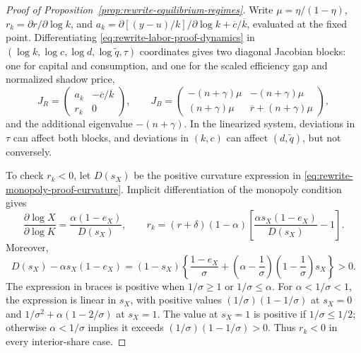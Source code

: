 \begin{proof}[Proof of Proposition~\ref{prop:rewrite-equilibrium-regimes}]
Write $\mu=\eta/(1-\eta)$,
$r_k=\partial r/\partial\log k$, and
$a_k=\partial[(y-u)/k]/\partial\log k+\overline c/\overline k$,
evaluated at the fixed point. Differentiating
\eqref{eq:rewrite-labor-proof-dynamics} in
$(\log k,\log c,\log d,\log\widetilde q,\tau)$ coordinates gives two
diagonal Jacobian blocks: one for capital and consumption, and one for the
scaled efficiency gap and normalized shadow price,
\begin{equation}
 J_R=\begin{pmatrix}
 a_k&-\overline c/\overline k\\ r_k&0
 \end{pmatrix},
 \qquad
 J_B=\begin{pmatrix}
 -(n+\gamma)\mu&-(n+\gamma)\mu\\
 (n+\gamma)\mu&\overline r+(n+\gamma)\mu
 \end{pmatrix},
 \label{eq:rewrite-labor-proof-blocks}
\end{equation}
and the additional eigenvalue $-(n+\gamma)$. In the linearized system,
deviations in $\tau$ can affect both blocks, and deviations in $(k,c)$
can affect $(d,\widetilde q)$, but not conversely.

To check $r_k<0$, let $D(s_X)$ be the positive curvature expression in
\eqref{eq:rewrite-monopoly-proof-curvature}. Implicit differentiation of the
monopoly condition gives
\[
 \frac{\partial\log X}{\partial\log K}
 =\frac{\alpha(1-e_X)}{D(s_X)},\qquad
 r_k=(r+\delta)(1-\alpha)
 \left[\frac{\alpha s_X(1-e_X)}{D(s_X)}-1\right].
\]
Moreover,
\[
 D(s_X)-\alpha s_X(1-e_X)
 =(1-s_X)\left\{\frac{1-e_X}{\sigma}+
       \left(\alpha-\frac1\sigma\right)
       \left(1-\frac1\sigma\right)s_X\right\}>0.
\]
The expression in braces is positive when $1/\sigma\geq1$ or $1/\sigma\leq\alpha$.
For $\alpha<1/\sigma<1$, the expression is linear in $s_X$, with positive
values $(1/\sigma)(1-1/\sigma)$ at $s_X=0$ and
$1/\sigma^2+\alpha(1-2/\sigma)$ at $s_X=1$.
The value at $s_X=1$ is positive if $1/\sigma\leq1/2$; otherwise $\alpha<1/\sigma$
implies it exceeds $(1/\sigma)(1-1/\sigma)>0$.
Thus $r_k<0$ in every interior-share case.


\end{proof}
